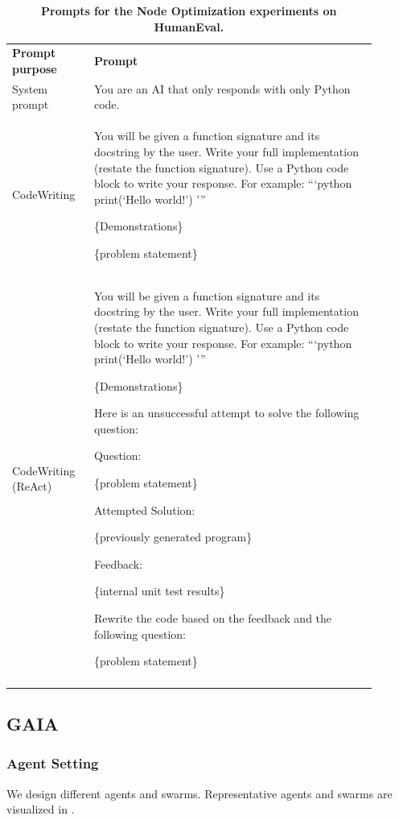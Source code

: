 \documentclass{article}
\theoremstyle{plain}
\theoremstyle{definition}
\theoremstyle{remark}
\begin{document}
\begin{table}[h!]
  \centering
  \caption{\textbf{Prompts for the Node Optimization experiments on HumanEval.}}
  \label{tab:humaneval_prompts}
  
  \renewcommand\tabcolsep{10pt}
  \renewcommand\arraystretch{1.3}
  \footnotesize 
  \begin{tabular}{|p{0.2\linewidth}|p{0.7\linewidth}|} 
    \Xhline{1.2pt}
    \rowcolor{champagne} 
    \textbf{Prompt purpose} & \textbf{Prompt} \\
    \Xhline{1.2pt}
        System prompt & You are an AI that only responds with only Python code. \\
    \Xhline{1.2pt}
    CodeWriting 
    &  You will be given a function signature and its docstring by the user. Write your full implementation (restate the function signature). Use a Python code block to write your response. For example:
```python
print(`Hello world!')
'''

\{Demonstrations\}

\{problem statement\}
 \\
    \Xhline{1.2pt}
    CodeWriting (ReAct) 
    & You will be given a function signature and its docstring by the user. Write your full implementation (restate the function signature). Use a Python code block to write your response. For example:
```python
print(`Hello world!')
'''

\{Demonstrations\}

Here is an unsuccessful attempt to solve the following question:

Question:

\{problem statement\}

Attempted Solution:

\{previously generated program\}

Feedback:

\{internal unit test results\}

Rewrite the code based on the feedback and the following question:

\{problem statement\} 
 \\
    \Xhline{1.2pt}
  \end{tabular}
\end{table}

\subsection{GAIA}
\subsubsection{Agent Setting}
We design different agents and swarms. Representative agents and swarms are visualized in .
\end{document}
